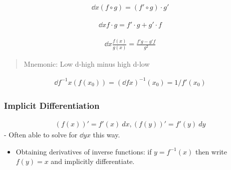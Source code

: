 \begin{proposition}

\begin{align*}
\dd{}{x}(f\circ g) = (f' \circ g) \cdot g'
\end{align*}

\end{proposition}

\begin{proposition}

\begin{align*}
\dd{}{x} f\cdot g =f'\cdot g + g' \cdot f
\end{align*}

\end{proposition}

\begin{proposition}

\begin{align*}
\dd{}{x} \frac{f(x)}{g(x)} = \frac{f'g - g'f}{g^2}
\end{align*}

\begin{quote}
Mnemonic: Low d-high minus high d-low
\end{quote}

\end{proposition}

\begin{proposition}

\begin{align*}
\dd{f^{-1}}{x}(f(x_0)) = \left( \dd{f}{x} \right)^{-1}(x_0) = 1/f'(x_0)
\end{align*}

\end{proposition}

\hypertarget{implicit-differentiation}{%
\subsubsection{Implicit
Differentiation}\label{implicit-differentiation}}

\begin{align*}
(f(x))' = f'(x)~dx, (f(y))' = f'(y)~dy
\end{align*} - Often able to solve for \(\dd{y}{x}\) this way.

\begin{itemize}
\tightlist
\item
  Obtaining derivatives of inverse functions: if \(y = f^{-1}(x)\) then
  write \(f(y) = x\) and implicitly differentiate.
\end{itemize}

